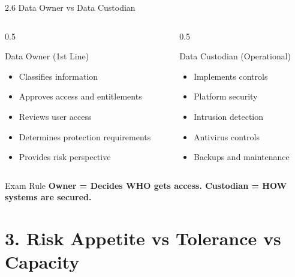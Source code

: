 \documentclass{beamer}
\begin{document}
	\begin{frame}{2.6 Data Owner vs Data Custodian}
		\begin{columns}
			\begin{column}{0.5\textwidth}
				\begin{block}{Data Owner (1st Line)}
					\begin{itemize}
						\item Classifies information
						\item Approves access and entitlements
						\item Reviews user access
						\item Determines protection requirements
						\item Provides risk perspective
					\end{itemize}
				\end{block}
			\end{column}
			\begin{column}{0.5\textwidth}
				\begin{block}{Data Custodian (Operational)}
					\begin{itemize}
						\item Implements controls
						\item Platform security
						\item Intrusion detection
						\item Antivirus controls
						\item Backups and maintenance
					\end{itemize}
				\end{block}
			\end{column}
		\end{columns}
		
		\begin{exampleblock}{Exam Rule}
			\textbf{Owner = Decides WHO gets access. Custodian = HOW systems are secured.}
		\end{exampleblock}
	\end{frame}
	
	\section{3. Risk Appetite vs Tolerance vs Capacity}
	
\end{document}
